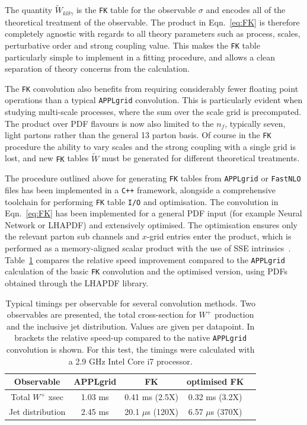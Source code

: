 The quantity $\widetilde{W}_{kl\delta\gamma}$ is the {\tt FK} table for the observable $\sigma$ and encodes all of the theoretical treatment of the observable. The product in Eqn.~\ref{eq:FK} is therefore completely
agnostic with regards to all theory parameters such as process, scales, perturbative order and strong coupling value. This makes the {\tt FK} table particularly simple to implement in a fitting procedure, and allows a clean separation
of theory concerns from the calculation.

The {\tt FK} convolution also benefits from requiring considerably fewer floating point operations than a typical { \tt APPLgrid} convolution. This is particularly evident when studying multi-scale processes, where the sum over the scale grid is precomputed. The product over PDF flavours is now also limited to the $n_f$, typically seven, light partons rather than the general 13 parton basis. Of course in the {\tt FK} procedure the ability to vary scales and the strong coupling with a single grid is lost, and new {\tt FK} tables $\widetilde{W}$ must be generated for different theoretical treatments.

The procedure outlined above for generating {\tt FK} tables from { \tt APPLgrid} or { \tt FastNLO} files has been implemented in a {\tt C++} framework, alongside a comprehensive toolchain for performing {\tt FK} table {\tt I/O} and optimisation. The convolution in Eqn.~\ref{eq:FK} has been implemented for a general PDF input (for example Neural Network or LHAPDF) and extensively optimised. The optimisation ensures only the relevant parton sub channels and $x$-grid entries enter the product, which is performed as a memory-aligned scalar product with the use of SSE intrinsics~\cite{SSE}.   Table~\ref{tab:FKtimings} compares the relative speed improvement compared to the { \tt APPLgrid} calculation of the basic  {\tt FK} convolution and the optimised version, using PDFs obtained through the LHAPDF library.
\begin{table}[htdp]
\begin{center}
\begin{tabular}{|c|c|c|c|c|}
\hline Observable &APPLgrid & FK & optimised FK \\
\hline Total $W^+$ xsec &1.03 ms & 0.41 ms (2.5X) & 0.32 ms (3.2X) \\
\hline Jet distribution &2.45 ms & 20.1 $\mu$s (120X) & 6.57 $\mu$s (370X) \\ 
\hline
\end{tabular}
\caption[Comparison of { \tt APPLgrid} and {\tt FK} convolution timings]{Typical timings per observable for several convolution methods. Two observables are presented, the total cross-section for $W^+$ production and the inclusive jet \pt  distribution. Values are given per datapoint. In brackets the relative speed-up compared to the native { \tt APPLgrid} convolution is shown. For this test, the timings were calculated with a 2.9 GHz Intel Core i7 processor.}
\end{center}
\label{tab:FKtimings}
\end{table}

